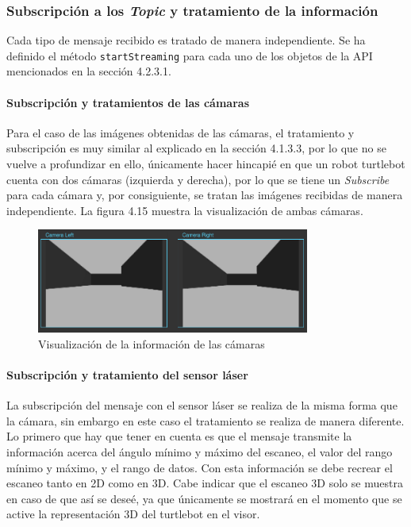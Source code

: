 \subsubsection{Subscripción a los \textit{Topic} y tratamiento de la información}
Cada tipo de mensaje recibido es tratado de manera independiente. Se ha definido el método \texttt{startStreaming} para cada uno de los objetos de la API mencionados en la sección 4.2.3.1.

\paragraph{Subscripción y tratamientos de las cámaras}

Para el caso de las imágenes obtenidas de las cámaras, el tratamiento y subscripción es muy similar al explicado en la sección 4.1.3.3, por lo que no se vuelve a profundizar en ello, únicamente hacer hincapié en que un robot turtlebot cuenta con dos cámaras (izquierda y derecha), por lo que se tiene un \textit{Subscribe} para cada cámara y, por consiguiente, se tratan las imágenes recibidas de manera independiente. La figura 4.15 muestra la visualización de ambas cámaras.

\begin{figure}[H]
  \begin{center}
    \includegraphics[width=0.8\textwidth]{figures/camarasturtle.png}
		\caption{Visualización de la información de las cámaras}
		\label{fig.camarasturtle}
		\end{center}
\end{figure}

\paragraph{Subscripción y tratamiento del sensor láser}

La subscripción del mensaje con el sensor láser se realiza de la misma forma que la cámara, sin embargo en este caso el tratamiento se realiza de manera diferente. Lo primero que hay que tener en cuenta es que el mensaje transmite la información acerca del ángulo mínimo y máximo del escaneo, el valor del rango mínimo y máximo, y el rango de datos. Con esta información se debe recrear el escaneo tanto en 2D como en 3D. Cabe indicar que el escaneo 3D solo se muestra en caso de que así se deseé, ya que únicamente se mostrará en el momento que se active la representación 3D del turtlebot en el visor.

